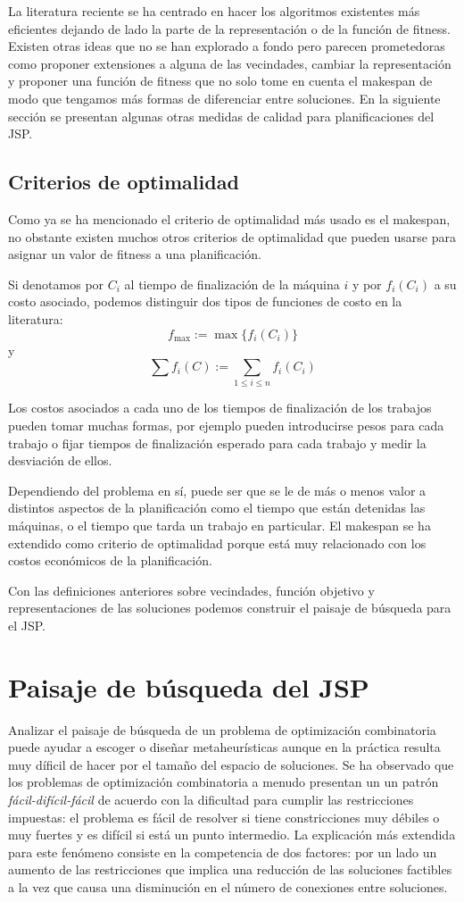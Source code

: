 La literatura reciente se ha centrado en hacer los algoritmos existentes más eficientes dejando de lado la parte de la representación o de la función de fitness. Existen otras ideas que no se han explorado a fondo pero parecen prometedoras como proponer extensiones a alguna de las vecindades, cambiar la representación y proponer una función de fitness que no solo tome en cuenta el makespan de modo que tengamos más formas de diferenciar entre soluciones. En la siguiente sección se presentan algunas otras medidas de calidad para planificaciones del JSP.
\subsection*{Criterios de optimalidad}
Como ya se ha mencionado el criterio de optimalidad más usado es el makespan, no obstante existen muchos otros criterios de optimalidad que pueden usarse para asignar un valor de fitness a una planificación. 

Si denotamos por $C_i$ al tiempo de finalización de la máquina $i$ y por $f_i(C_i)$ a su costo asociado, podemos distinguir dos tipos de funciones de costo en la literatura\cite{Brucker2001}:
\[f_{\max}:=\max\{f_i(C_i)\}\]
y 
\[\sum f_i(C):=\sum_{1\leq i\leq n}f_i(C_i)\]

Los costos asociados a cada uno de los tiempos de finalización de los trabajos pueden tomar muchas formas, por ejemplo pueden introducirse pesos para cada trabajo o fijar tiempos de finalización esperado para cada trabajo y medir la desviación de ellos.

Dependiendo del problema en sí, puede ser que se le de más o menos valor a distintos aspectos de la planificación como el tiempo que están detenidas las máquinas, o el tiempo que tarda un trabajo en particular. El makespan se ha extendido como criterio de optimalidad porque está muy relacionado con los costos económicos de la planificación\cite{Rand1977}.


Con las definiciones anteriores sobre vecindades, función objetivo y representaciones de las soluciones podemos construir el paisaje de búsqueda para el JSP. 

\section{Paisaje de búsqueda del JSP}

Analizar el paisaje de búsqueda de un problema de optimización combinatoria puede ayudar a escoger o diseñar metaheurísticas aunque en la práctica resulta muy díficil de hacer por el tamaño del espacio de soluciones. Se ha observado que los problemas de optimización combinatoria a menudo presentan un un patrón \textit{fácil-difícil-fácil} \cite{mammen1997new} de acuerdo con la dificultad para cumplir las restricciones impuestas: el problema es fácil de resolver si tiene constricciones muy débiles o muy fuertes y es difícil si está un punto intermedio. La explicación más extendida para este fenómeno consiste en la competencia de dos factores: por un lado un aumento de las restricciones que implica una reducción de las soluciones factibles a la vez que causa una disminución en el número de conexiones entre soluciones.\\


